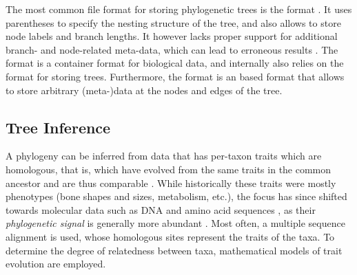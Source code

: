 

The most common file format for storing phylogenetic trees is the  format \cite{Archie1986}.
It uses parentheses to specify the nesting structure of the tree,
and also allows to store node labels and branch lengths.
It however lacks proper support for additional branch- and node-related meta-data,
which can lead to erroneous results \cite{Czech2017-tree-viewers}.
The  format \cite{Maddison1997} is a container format for biological data,
and internally also relies on the  format for storing trees.
Furthermore, the  format \cite{Han2009} is an  based format
that allows to store arbitrary (meta-)data at the nodes and edges of the tree.


\subsection{Tree Inference}
\label{ch:Foundations:sec:TreeOfLife:sub:TreeInference}

A phylogeny can be inferred from data that has per-taxon traits which are homologous,
that is, which have evolved from the same traits in the common ancestor and are thus comparable \cite{Felsenstein2004,Yang2006}.
While historically these traits were mostly phenotypes (bone shapes and sizes, metabolism, etc.),
the focus has since shifted towards molecular data such as DNA and amino acid sequences \cite{Zuckerkandl1965},
as their \emph{phylogenetic signal} is generally more abundant \cite{Hillis2000}.
Most often, a multiple sequence alignment is used,
whose homologous sites represent the traits of the taxa.
To determine the degree of relatedness between taxa, mathematical models of trait evolution are employed.

